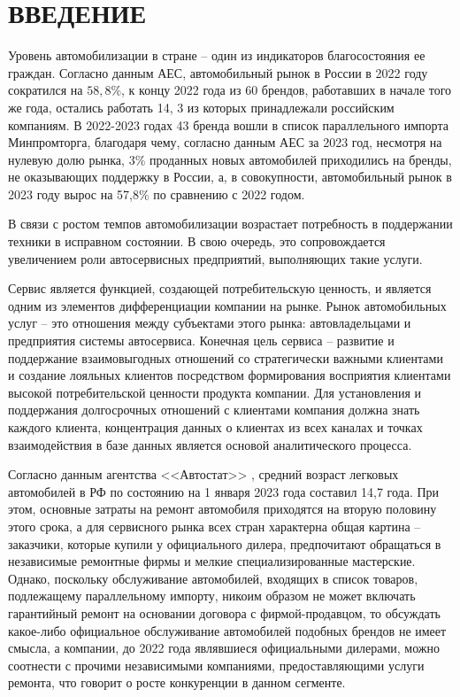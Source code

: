 \chapter*{ВВЕДЕНИЕ}

Уровень автомобилизации в стране -- один из индикаторов благосостояния ее граждан\cite{diler}. 
Согласно данным АЕС\cite{stat2022aebrus}, автомобильный рынок в России в 2022 году сократился на $58,8\%$, к концу 2022 года из 60 брендов, работавших в начале того же года, остались работать 14, 3 из которых принадлежали российским компаниям. 
В 2022-2023 годах 43 бренда вошли в список параллельного импорта Минпромторга\cite{parallelimport}, благодаря чему, согласно данным АЕС за 2023 год\cite{stat2023aebrus}, несмотря на нулевую долю рынка, 3\% проданных новых автомобилей приходились на бренды, не оказывающих поддержку в России, а, в совокупности, автомобильный рынок в 2023 году вырос на 57,8\% по сравнению с 2022 годом. 

В связи с ростом темпов автомобилизации возрастает потребность в поддержании техники в исправном состоянии\cite{diler}. 
В свою очередь, это сопровождается увеличением роли автосервисных предприятий, выполняющих такие услуги\cite{diler}.
 
Сервис является функцией, создающей потребительскую ценность, и является одним из элементов дифференциации компании на рынке\cite{upravavto}. 
Рынок автомобильных услуг -- это отношения между субъектами этого рынка: автовладельцами и предприятия системы автосервиса\cite{upravavto}.
Конечная цель сервиса -- развитие и поддержание взаимовыгодных отношений со стратегически важными клиентами и создание лояльных клиентов посредством формирования восприятия клиентами высокой потребительской ценности продукта компании\cite{upravavto}. 
Для установления и поддержания долгосрочных отношений с клиентами компания должна знать каждого клиента, концентрация данных о клиентах из всех каналах и точках взаимодействия в базе данных является основой аналитического процесса\cite{upravavto}. 

Согласно данным агентства <<Автостат>> \cite{yearold}, средний возраст легковых автомобилей в РФ по состоянию на 1 января 2023 года составил 14,7 года. 
При этом, основные затраты на ремонт автомобиля приходятся на вторую половину этого срока, а для сервисного рынка всех стран характерна общая картина -- заказчики, которые купили у официального дилера, предпочитают обращаться в независимые ремонтные фирмы и мелкие специализированные мастерские\cite{volgin}. 
Однако, поскольку обслуживание автомобилей, входящих в список товаров, подлежащему параллельному импорту, никоим образом не может включать гарантийный ремонт на основании договора с фирмой-продавцом, то обсуждать какое-либо официальное обслуживание автомобилей подобных брендов не имеет смысла, а компании, до 2022 года являвшиеся официальными дилерами, можно соотнести с прочими независимыми компаниями, предоставляющими услуги ремонта, что говорит о росте конкуренции в данном сегменте. 

